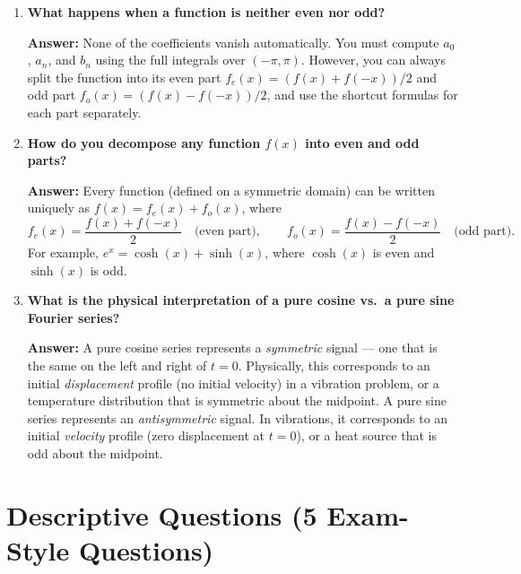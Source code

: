 \documentclass[12pt,a4paper]{article}
\begin{document}
\begin{enumerate}[label=\textbf{Q\arabic*.}]
\item \textbf{What happens when a function is neither even nor odd?}

  \textbf{Answer:} None of the coefficients vanish automatically. You must compute $a_0$,
  $a_n$, and $b_n$ using the full integrals over $(-\pi,\pi)$. However, you can always split
  the function into its even part $f_e(x) = (f(x)+f(-x))/2$ and odd part
  $f_o(x) = (f(x)-f(-x))/2$, and use the shortcut formulas for each part separately.

\item \textbf{How do you decompose any function $f(x)$ into even and odd parts?}

  \textbf{Answer:} Every function (defined on a symmetric domain) can be written uniquely as
  $f(x) = f_e(x) + f_o(x)$, where
  \[
    f_e(x) = \frac{f(x)+f(-x)}{2} \quad \text{(even part)}, \qquad
    f_o(x) = \frac{f(x)-f(-x)}{2} \quad \text{(odd part)}.
  \]
  For example, $e^x = \cosh(x) + \sinh(x)$, where $\cosh(x)$ is even and $\sinh(x)$ is odd.

\item \textbf{What is the physical interpretation of a pure cosine vs.\ a pure sine Fourier series?}

  \textbf{Answer:} A pure cosine series represents a \emph{symmetric} signal --- one that is
  the same on the left and right of $t = 0$. Physically, this corresponds to an initial
  \emph{displacement} profile (no initial velocity) in a vibration problem, or a temperature
  distribution that is symmetric about the midpoint. A pure sine series represents an
  \emph{antisymmetric} signal. In vibrations, it corresponds to an initial \emph{velocity}
  profile (zero displacement at $t=0$), or a heat source that is odd about the midpoint.

\end{enumerate}

\section{Descriptive Questions (5 Exam-Style Questions)}
\end{document}
